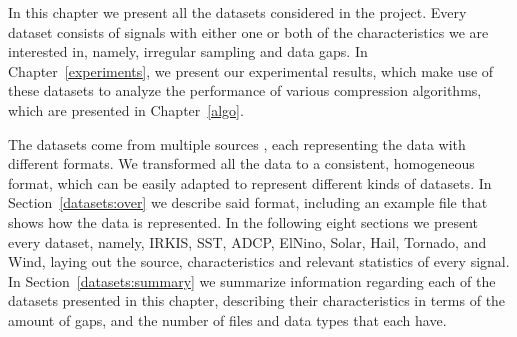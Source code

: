 






\newcommand{\dataCite}{\cite{dataset:irkis, dataset:irkis2, dataset:sst1, dataset:elnino, dataset:solar, dataset:spc}}

In this chapter we present all the datasets considered in the project. Every dataset consists of signals with either one or both of the characteristics we are interested in, namely, irregular sampling and data gaps. In Chapter~\ref{experiments}, we present our experimental results, which make use of these datasets to analyze the performance of various compression algorithms, which are presented in Chapter~\ref{algo}.


The datasets come from multiple sources \dataCite, each representing the data with different formats. We transformed all the data to a consistent, homogeneous format, which can be easily adapted to represent different kinds of datasets. In Section~\ref{datasets:over} we describe said format, including an example file that shows how the data is represented. In the following eight sections we present every dataset, namely, IRKIS, SST, ADCP, ElNino, Solar, Hail, Tornado, and Wind, laying out the source, characteristics and relevant statistics of every signal. In Section~\ref{datasets:summary} we summarize information regarding each of the datasets presented in this chapter, describing their characteristics in terms of the amount of gaps, and the number of files and data types that each have. 


